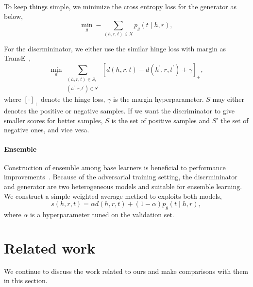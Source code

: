 \documentclass[twocolumn,a4paper,10pt,review,3p]{elsarticle}
\begin{document}
To keep things simple, we minimize the cross entropy loss for the generator as below,
\[
    \min_g -\sum_{(h, r, t)\in X} p_g(t \mid h, r),
\]

For the discrmininator, we either use the similar hinge loss with margin as TransE~\cite{TransE2013},
\[
    \min_d \sum_{\substack{(h, r, t)\in S,\\ (h^\prime, r, t^\prime)\in S^\prime }}
        {[ d(h, r, t) - d(h^\prime, r, t^\prime) + \gamma ]}_+,
\]
where ${[\cdot]}_+$ denote the hinge loss, $\gamma$ is the margin hyperparameter. $S$ may either denotes the positive or negative samples. If we want the discriminator to give smaller scores for better samples, $S$ is the set of positive samples and $S'$ the set of negative ones, and vice vesa.

\paragraph{Ensemble} Construction of ensemble among base learners is beneficial to performance improvements~\cite{dietterich2000ensemble}. Because of the adversarial training setting, the discrmininator and generator are two heterogeneous models and suitable for ensemble learning. We construct a simple weighted average method to exploits both models,
\[
    s(h, r, t) = \alpha d(h, r, t) + (1 - \alpha) p_g(t \mid h, r),
\]
where $\alpha$ is a hyperparameter tuned on the validation set.


\section{Related work}

We continue to discuss the work related to ours and make comparisons with them in this section.
\end{document}
